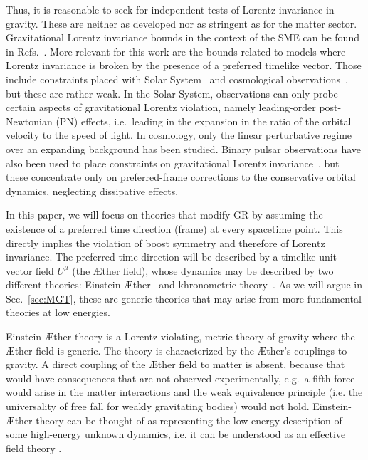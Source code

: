 \documentclass[prd,aps,twocolumn,nofootinbib,showpacs,superscriptaddress]{revtex4-1}
\begin{document}
Thus, it is reasonable to seek for independent tests of Lorentz invariance in gravity. These are neither as developed nor as stringent as
for the matter sector.  Gravitational Lorentz invariance bounds in the context of the SME can be found in Refs.~\cite{Bailey:2006fd,Bailey:2009me,Bailey:2013oda}. 
More relevant for this work are the bounds related to models where Lorentz invariance is broken by the presence of a preferred timelike vector.
Those include constraints placed with Solar System~\cite{will-living,Blas:2011zd,Jacobson:2008aj} and cosmological 
observations~\cite{Jacobson:2008aj,Zuntz:2008zz,Li:2007vz,Audren:2013dwa}, but these are
rather weak. In the Solar System, observations can only probe certain aspects of gravitational Lorentz violation, 
namely leading-order post-Newtonian (PN) effects, i.e.~leading in the expansion in the ratio of the orbital velocity to the speed of light. In cosmology, only the linear perturbative regime over an expanding background has been studied.
Binary pulsar observations have also been used to place constraints on gravitational Lorentz invariance~\cite{Jacobson:2008aj,Bell:1995jz,Shao:2012eg,Shao:2013wga}, but these concentrate only on preferred-frame corrections
to the conservative orbital dynamics, neglecting dissipative effects. 

In this paper, we will focus on theories that modify GR by assuming
the existence of a preferred time direction (frame) at every spacetime point. 
This directly implies the violation of boost symmetry and therefore of Lorentz invariance.
The preferred time direction will be described by a timelike
unit vector field $U^\mu$ (the \AE ther field), whose dynamics may be
described by two different theories: Einstein-\AE ther~\cite{Jacobson:2000xp} 
and khronometric theory~\cite{Blas:2009qj}.
As we will argue in Sec.~\ref{sec:MGT}, these are
 generic theories that may arise 
from more fundamental theories at low energies.

Einstein-\AE ther theory is a Lorentz-violating,
metric theory of gravity where the \AE ther field is generic. The theory  is
characterized by the \AE ther's couplings 
to gravity.  A direct coupling of the \AE ther  field to matter is absent, 
because that would have consequences that are not observed experimentally, e.g.~a 
fifth force would arise in the matter interactions and the weak equivalence principle (i.e.
the universality of free fall for weakly gravitating bodies) would not hold.
Einstein-\AE ther theory can be thought of as representing the
low-energy description of some high-energy unknown dynamics, i.e. it can be understood as an effective field theory \cite{ArmendarizPicon:2010mz}.
\end{document}
